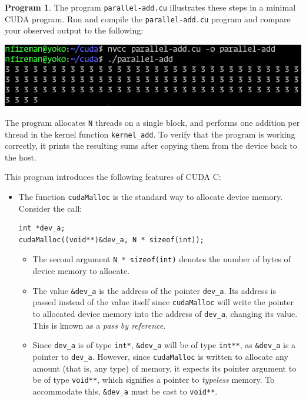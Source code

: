 \documentclass{article}
\theoremstyle{definition}
\newtheorem{program}{Program}
\begin{document}
\begin{program}
The program \texttt{parallel-add.cu} illustrates these steps in a minimal CUDA program. Run and compile the \texttt{parallel-add.cu} program and compare your observed output to the following:

\includegraphics[width=\textwidth]{images/parallel-add-output.png}

The program allocates \texttt{N} threads on a single block, and performs one addition per thread in the kernel function \texttt{kernel\_add}. To verify that the program is working correctly, it prints the resulting sums after copying them from the device back to the host.

This program introduces the following features of CUDA C:
\begin{itemize}
\item 
The function \texttt{cudaMalloc} is the standard way to allocate device memory. Consider the call:
\begin{verbatim}int *dev_a;
cudaMalloc((void**)&dev_a, N * sizeof(int));\end{verbatim}
    
    \begin{itemize}
    
    \item 
    The second argument \texttt{N * sizeof(int)} denotes the number of bytes of device memory to allocate.
    
    \item 
    The value \texttt{\&dev\_a} is the address of the pointer \texttt{dev\_a}. Its address is passed instead of the value itself since \texttt{cudaMalloc} will write the pointer to allocated device memory into the address of \texttt{dev\_a}, changing its value. This is known as a \emph{pass by reference}.
    
    \item 
    Since \texttt{dev\_a} is of type \texttt{int*}, \texttt{\&dev\_a} will be of type \texttt{int**}, as \texttt{\&dev\_a} is a pointer to \texttt{dev\_a}. However, since \texttt{cudaMalloc} is written to allocate any amount (that is, any type) of memory, it expects its pointer argument to be of type \texttt{void**}, which signifies a pointer to \emph{typeless} memory. To accommodate this, \texttt{\&dev\_a} must be cast to \texttt{void**}.
    

\end{itemize}
\end{itemize}
\end{program}
\end{document}
